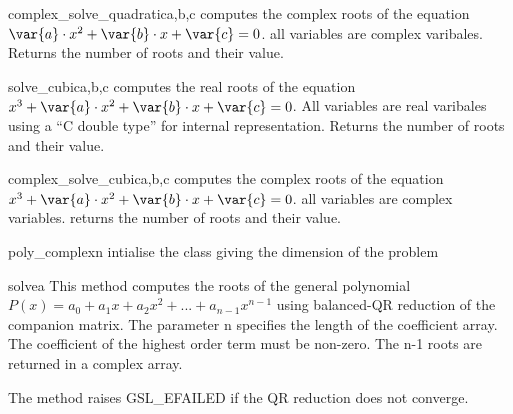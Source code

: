 \begin{funcdesc}{complex_solve\_quadratic}{a,b,c}
  computes the complex roots of the equation
  $\var{a} \cdot x^2 + \var{b} \cdot x + \var{c} = 0$.
  all variables are complex varibales.
  Returns the number of roots and their value.
\end{funcdesc}

\begin{funcdesc}{solve\_cubic}{a,b,c}
  computes the real roots of the equation
  $x^3 + \var{a} \cdot x^2 + \var{b} \cdot x + \var{c} = 0$.
  All variables are real varibales using a ``C double type'' for internal representation.
  Returns the number of roots and their value.
\end{funcdesc}


\begin{funcdesc}{complex\_solve\_cubic}{a,b,c}
  computes the complex roots of the equation
  $x^3 + \var{a} \cdot x^2 + \var{b} \cdot x + \var{c} = 0$.
  all variables are complex variables.
  returns the number of roots and their value.
\end{funcdesc}

\begin{classdesc}{poly_complex}{n}
  intialise the class giving the dimension of the problem
  \begin{methoddesc}{solve}{a}
    This method computes the roots of the general polynomial 
    $P(x) = a_0 + a_1 x + a_2 x^2 + ... + a_{n-1} x^{n-1}$ using balanced-QR reduction
    of the companion matrix. The  parameter n specifies the length of the
    coefficient array. The coefficient of  the highest order term must be
    non-zero.   The  n-1 roots are  returned in a complex array.
    
    The method raises GSL_EFAILED if the QR reduction does not converge.
  \end{methoddesc}  
\end{classdesc}